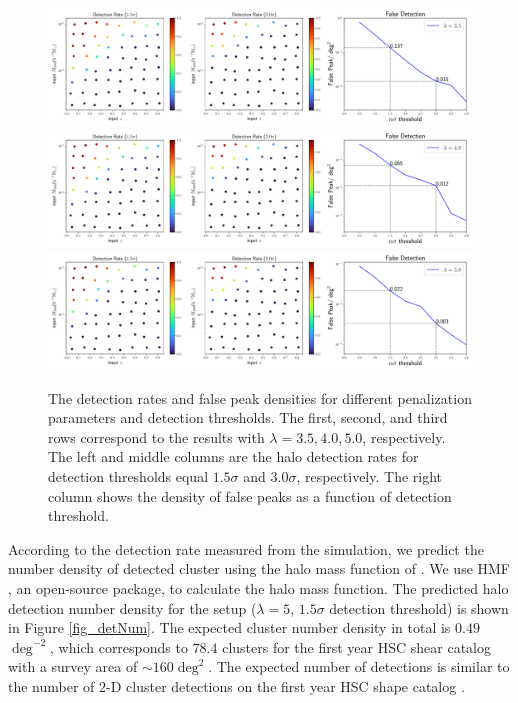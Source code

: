 \begin{figure}
 \centering
 \includegraphics[width=1.0\textwidth]{detfalse_threshold_NFW_lbd35.pdf}
 \includegraphics[width=1.0\textwidth]{detfalse_threshold_NFW_lbd40.pdf}
 \includegraphics[width=1.0\textwidth]{detfalse_threshold_NFW_lbd50.pdf}
 \caption{The detection rates and false peak densities for different
     penalization parameters and detection thresholds. The first, second, and
     third rows correspond to the results with $\lambda=3.5,4.0,5.0$,
     respectively. The left and middle columns are the halo detection rates for
     detection thresholds equal $1.5\sigma$ and $3.0\sigma$, respectively. The
     right column shows the density of false peaks as a function of detection
     threshold.
    } \label{fig_detFalsRateNFW}
\end{figure}

According to the detection rate measured from the simulation, we predict the
number density of detected cluster using the halo mass function of
\citet{haloMass-Tinker2008}. We use HMF \citep{hmf-Murray2013}, an open-source
package, to calculate the halo mass function.  The predicted halo detection
number density for the setup ($\lambda=5$, $1.5\sigma$ detection threshold) is
shown in Figure \ref{fig_detNum}. The expected cluster number density in total
is $0.49$ $\deg^{-2}$, which corresponds to $78.4$ clusters for the first year
HSC shear catalog \citep{HSC1-catalog} with a survey area of $\sim 160 \deg^2$.
The expected number of detections is similar to the number of $2$-D cluster
detections on the first year HSC shape catalog \citep{HSC1-massMap-cluster}.

